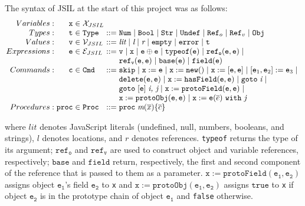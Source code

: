 \documentclass[a4paper,11pt,twoside]{report}
\begin{document}
The syntax of JSIL at the start of this project was as follows:
$$
\arraycolsep=1.5pt
\begin{array}{rrclcl}
Variables : &  \mathtt{x} & \in & \mathcal{X}_{JSIL} \\
Types: & \mathtt{t} & \in & \mathtt{Type} & ::= & \mathtt{Num} \myor \mathtt{Bool} \myor \mathtt{Str} \myor \mathtt{Undef} \myor \mathtt{Ref}_o \myor \mathtt{Ref}_v \myor \mathtt{Obj} \\
Values: & \mathtt{v} & \in & \mathcal{V}_{JSIL} & ::= &\textit{lit} \myor \textit{l} \myor \textit{r} \myor \mathtt{empty} \myor \mathtt{error} \myor \mathtt{t} \\
Expressions: & \mathtt{e} & \in & \mathcal{E}_{JSIL} & ::= &\mathtt{v} \myor \mathtt{x} \myor \mathtt{e} \oplus \mathtt{e} \myor \mathtt{typeof}(\mathtt{e}) \myor \mathtt{ref_o}(\mathtt{e,e}) \myor \\
& & & & & \mathtt{ref_v}(\mathtt{e,e}) \myor \mathtt{base}(\mathtt{e}) \myor \mathtt{field}(\mathtt{e}) 
\\
Commands: & \mathtt{c} & \in & \mathtt{Cmd} & ::= & \mathtt{skip} \myor \mathtt{x} := \mathtt{e} \myor \mathtt{x} := \mathtt{new}() \myor \mathtt{x} := [\mathtt{e,e}] \myor [\mathtt{e}_1,\mathtt{e}_2] := \mathtt{e}_3 \myor  \\
& & & & & \mathtt{delete}(\mathtt{e,e}) \myor \mathtt{x} := \mathtt{hasField}(\mathtt{e,e}) \myor \mathtt{goto} \hspace{3pt} \textit{i} \myor \\
& & & & & \mathtt{goto} \hspace{3pt} [\mathtt{e}] \hspace{3pt} \textit{i, j} \myor \mathtt{x} := \mathtt{protoField} (\mathtt{e,e}) \myor \\
& & & & & \mathtt{x} := \mathtt{protoObj}(\mathtt{e,e}) \myor \mathtt{x} := \mathtt{e}(\overline{e})\ \mathtt{with}\ \textit{j}
\\
Procedures: & \mathtt{proc} & \in & \mathtt{Proc} & ::= & \mathtt{proc} \hspace{3pt} \textit{m}(\overline{x})\{\overline{c}\}
\end{array}
$$

where $lit$ denotes JavaScript literals (undefined, null, numbers, booleans, and strings), $l$ denotes locations, and $r$ denotes references. \texttt{typeof} returns the type of its argument; $\mathtt{ref_o}$ and $\mathtt{ref_v}$ are used to construct object and variable references, respectively; $\mathtt{base}$ and $\mathtt{field}$ return, respectively, the first and second component of the reference that is passed to them as a parameter. $\mathtt{x := protoField(e_1, e_2)}$ assigns object $\mathtt{e_1}$'s field $\mathtt{e_2}$ to \texttt{x} and $\mathtt{x := protoObj(e_1, e_2)}$ assigns $\mathtt{true}$ to \texttt{x} if object $\mathtt{e_2}$ is in the prototype chain of object $\mathtt{e_1}$ and \texttt{false} otherwise.
\end{document}
